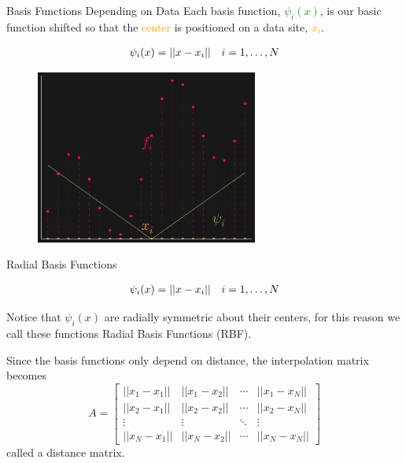 \documentclass[12pt,t]{beamer}
\newcommand{\subt}[1]{{\footnotesize \color{subtitle} {#1}}}
\begin{document}
\begin{frame}{Basis Functions Depending on Data}
Each basis function, \textcolor{green}{$\psi_i(x)$}, is our basic function shifted so that the \textcolor{orange}{center} is positioned on a data site, \textcolor{orange}{$x_i$}.

\begin{align*}
&\psi_i(x)=||x-x_i||  &i=1, \mathellipsis, N
\end{align*}


\begin{figure}
\includegraphics[width=0.65\textwidth, keepaspectratio]{basicbasis.png}
\end{figure}


\end{frame}

\begin{frame}{Radial Basis Functions}

\begin{align*}
&\psi_i(x)=||x-x_i||     & i=1, \mathellipsis, N
\end{align*}

Notice that $\psi_i(x)$ are radially symmetric about their centers, for this reason we call these functions \subt{Radial Basis Functions (RBF)}.
\bigskip

Since the basis functions only depend on distance, the interpolation matrix becomes
\begin{equation*}
A=
\begin{bmatrix}
||x_1-x_1|| & ||x_1-x_2|| & \cdots & ||x_1-x_N||\\
||x_2-x_1|| & ||x_2-x_2||& \cdots & ||x_2-x_N||\\
\vdots & \vdots & \ddots & \vdots\\
||x_N-x_1|| & ||x_N-x_2||& \cdots & ||x_N-x_N||
\end{bmatrix}
\end{equation*}
called a \subt{distance matrix}.

\note{}
\end{frame}
\end{document}
